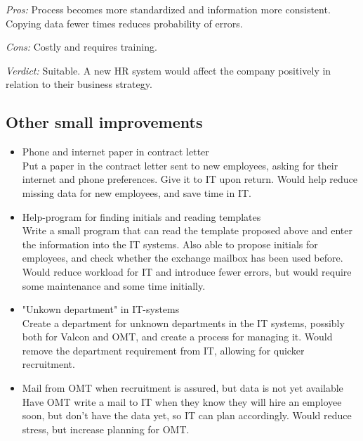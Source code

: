 \noindent \emph{Pros:} Process becomes more standardized and information more consistent. Copying data fewer times reduces probability of errors.

\noindent \emph{Cons:} Costly and requires training.

\emph{Verdict:}
Suitable. A new HR system would affect the company positively in relation to their business strategy.

\subsection{Other small improvements}
\begin{itemize}
	\item Phone and internet paper in contract letter\\
	
			Put a paper in the contract letter sent to new employees, asking for their internet and phone preferences. Give it to IT upon return. Would help reduce missing data for new employees, and save time in IT.

	\item Help-program for finding initials and reading templates\\
	
			Write a small program that can read the template proposed above and enter the information into the IT systems.
			Also able to propose initials for employees, and check whether the exchange mailbox has been used before.
			Would reduce workload for IT and introduce fewer errors, but would require some maintenance and some time initially.
	
	\item "Unkown department" in IT-systems\\
	
			Create a department for unknown departments in the IT systems, possibly both for Valcon and OMT, and create a process for managing it.
			Would remove the department requirement from IT, allowing for quicker recruitment.
			
	\item Mail from OMT when recruitment is assured, but data is not yet available\\
	
			Have OMT write a mail to IT when they know they will hire an employee soon, but don't have the data yet, so IT can plan accordingly.
			Would reduce stress, but increase planning for OMT.
\end{itemize}